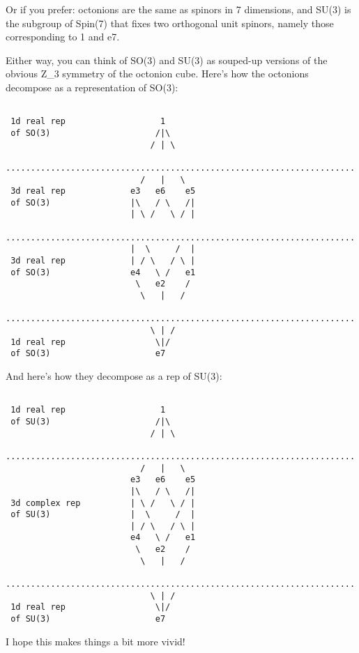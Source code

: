 Or if you prefer: octonions are the same as spinors in 7 dimensions, 
and SU(3) is the subgroup of Spin(7) that fixes two orthogonal 
unit spinors, namely those corresponding to 1 and e7.

Either way, you can think of SO(3) and SU(3) as souped-up versions
of the obvious Z_{3} symmetry of the octonion cube.  Here's how
the octonions decompose as a representation of SO(3):



\begin{verbatim}

 1d real rep                   1
 of SO(3)                     /|\
                             / | \
 ......................................................................
                           /   |   \          
 3d real rep             e3   e6    e5   
 of SO(3)                |\   / \   /| 
                         | \ /   \ / |
 ......................................................................
                         |  \     /  |
 3d real rep             | / \   / \ |
 of SO(3)                e4   \ /   e1 
                          \   e2    / 
                           \   |   /                       
 ......................................................................
                             \ | /
 1d real rep                  \|/
 of SO(3)                     e7
\end{verbatim}
    
And here's how they decompose as a rep of SU(3):




\begin{verbatim}

 1d real rep                   1
 of SU(3)                     /|\
                             / | \
 ......................................................................
                           /   |   \          
                         e3   e6    e5   
                         |\   / \   /| 
 3d complex rep          | \ /   \ / |
 of SU(3)                |  \     /  |
                         | / \   / \ |
                         e4   \ /   e1 
                          \   e2    / 
                           \   |   /                       
 ......................................................................
                             \ | /
 1d real rep                  \|/
 of SU(3)                     e7
\end{verbatim}
    
I hope this makes things a bit more vivid!  


